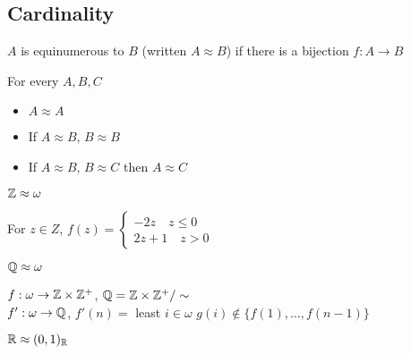 
\subsection{Cardinality}

\begin{definition}
    $A$ is equinumerous to $B$ (written $A \approx B$) if there is a bijection $f: A \to B$ 
\end{definition}

\begin{theorem}
    For every $A, B, C$ 
    \begin{itemize}
        \item $A \approx A$ 
        \item If $A \approx B$, $B \approx B$ 
        \item If $A \approx B$, $B \approx C$ then $A \approx C$ 
    \end{itemize}
\end{theorem}

\begin{lemma}
    $\mathbb{Z} \approx \omega$ 
\end{lemma}

\begin{pf}
    For $z \in Z$, $f(z)  = \begin{cases} -2z \quad z \le 0 \\ 2z+1 \quad z > 0 \end{cases}$ 
\end{pf}

\begin{lemma}
    $\mathbb{Q} \approx \omega$ 
\end{lemma}

\begin{pf}
    $f: \omega \to \mathbb{Z} \times \mathbb{Z}^+$, $\mathbb{Q} = \mathbb{Z} \times \mathbb{Z}^+/\sim$ \\
    $f': \omega \to \mathbb{Q}$, $f'(n)=$ least $i \in \omega$ $g(i) \not\in \{f(1), \ldots, f(n-1)\}$ 
\end{pf}

\begin{lemma}
    $\mathbb{R} \approx (0,1)_{\mathbb{R}}$ 
\end{lemma}
